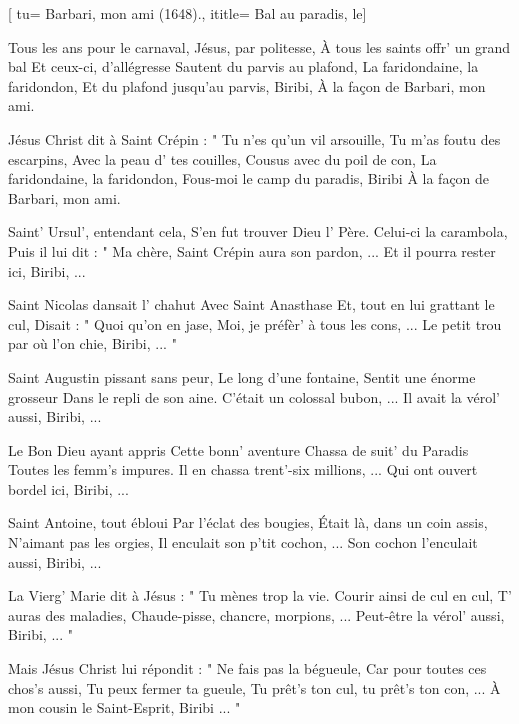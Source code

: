 [
tu= {Barbari, mon ami (1648).},
ititle= {Bal au paradis, le}]


\beginverse
Tous les ans pour le carnaval,
Jésus, par politesse,
À tous les saints offr' un grand bal
Et ceux-ci, d'allégresse
Sautent du parvis au plafond,
La faridondaine, la faridondon,
Et du plafond jusqu'au parvis, Biribi,
À la façon de Barbari, mon ami.
\endverse

\beginverse
Jésus Christ dit à Saint Crépin :
" Tu n'es qu'un vil arsouille,
Tu m'as foutu des escarpins,
Avec la peau d' tes couilles,
Cousus avec du poil de con,
La faridondaine, la faridondon,
Fous-moi le camp du paradis, Biribi
À la façon de Barbari, mon ami.
\endverse

\beginverse
Saint' Ursul', entendant cela,
S'en fut trouver Dieu l' Père.
Celui-ci la carambola,
Puis il lui dit : " Ma chère,
Saint Crépin aura son pardon, ...
Et il pourra rester ici, Biribi, ...
\endverse

\beginverse
Saint Nicolas dansait l' chahut
Avec Saint Anasthase
Et, tout en lui grattant le cul,
Disait : " Quoi qu'on en jase,
Moi, je préfèr' à tous les cons, ...
Le petit trou par où l'on chie, Biribi, ... "
\endverse

\beginverse
Saint Augustin pissant sans peur,
Le long d'une fontaine,
Sentit une énorme grosseur
Dans le repli de son aine.
C'était un colossal bubon, ...
Il avait la vérol' aussi, Biribi, ...
\endverse

\beginverse
Le Bon Dieu ayant appris
Cette bonn' aventure
Chassa de suit' du Paradis
Toutes les femm's impures.
Il en chassa trent'-six millions, ...
Qui ont ouvert bordel ici, Biribi, ...
\endverse

\beginverse
Saint Antoine, tout ébloui
Par l'éclat des bougies,
Était là, dans un coin assis,
N'aimant pas les orgies,
Il enculait son p'tit cochon, ...
Son cochon l'enculait aussi, Biribi, ...
\endverse

\beginverse
La Vierg' Marie dit à Jésus :
" Tu mènes trop la vie.
Courir ainsi de cul en cul,
T' auras des maladies,
Chaude-pisse, chancre, morpions, ...
Peut-être la vérol' aussi, Biribi, ... "
\endverse

\beginverse
Mais Jésus Christ lui répondit :
" Ne fais pas la bégueule,
Car pour toutes ces chos's aussi,
Tu peux fermer ta gueule,
Tu prêt's ton cul, tu prêt's ton con, ...
À mon cousin le Saint-Esprit, Biribi ... "
\endverse


